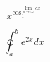 \documentclass[12pt,a4paper]{article}
\begin{document}
$$
x^{\cos_{1}^{\lim_{n \to \infty} e     x}}
$$

$$ \oint_a^b e^{2x} dx $$
\end{document}
